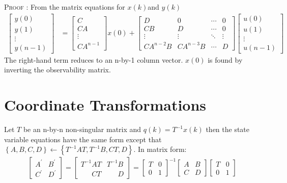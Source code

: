 \documentclass[a4paper,twoside,10pt,english]{report}
\begin{document}
\textsc{Proof} : From the matrix equations for $x\left(k\right)$and
$y (k)$
\begin{align*}
\left[\begin{array}{c}
y\left(0\right)\\
y\left(1\right)\\
\vdots\\
y\left(n-1\right)
\end{array}\right] &= \left[\begin{array}{c}
C\\
CA\\
\vdots\\
CA^{n-1}
\end{array}\right]x\left(0\right)+\left[\begin{array}{cccc}
D & 0 & \cdots & 0\\
CB & D & \cdots & 0\\
\vdots & \vdots & \ddots & \vdots\\
CA^{n-2}B & CA^{n-3}B & \cdots & D
\end{array}\right]\left[\begin{array}{c}
u\left(0\right)\\
u\left(1\right)\\
\vdots\\
u\left(n-1\right)
\end{array}\right]
\end{align*}
The right-hand term reduces to an n-by-1 column vector. $x\left(0\right)$
is found by inverting the observability matrix.

\section{\label{sec:coordinate-transformations}Coordinate Transformations}
Let $T$ be an n-by-n non-singular matrix and 
$q\left(k\right)=T^{-1}x\left(k\right)$
then the state variable equations have the same form except that
$\left\{A,B,C,D\right\} \leftarrow \left\{T^{-1}AT,T^{-1}B,CT,D\right\}$. In
matrix form:
\begin{align*}
\left[\begin{array}{cc}
A^{\prime} & B^{\prime}\\
C^{\prime} & D^{\prime}
\end{array}\right] =
\left[\begin{array}{cc}
T^{-1}AT          & T^{-1}B\\
\phantom{T^{-1}}CT & \phantom{T^{-1}}D
\end{array}\right] =
\left[\begin{array}{cc}
T & 0\\
0 & 1
\end{array}\right]^{-1}
\left[\begin{array}{cc}
A & B\\
C & D
\end{array}\right]
\left[\begin{array}{cc}
T & 0\\
0 & 1
\end{array}\right]
\end{align*}
\end{document}
